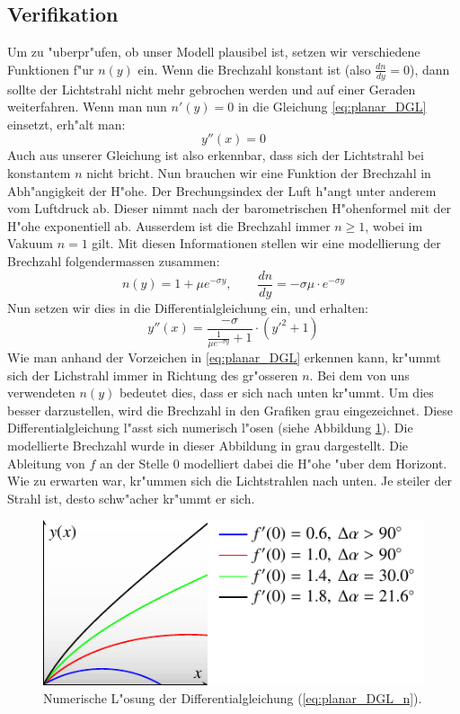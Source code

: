 \begin{refsection}
\subsection{Verifikation}
Um zu "uberpr"ufen, ob unser Modell plausibel ist, setzen wir verschiedene Funktionen f"ur $n(y)$ ein. 
Wenn die Brechzahl konstant ist (also $\frac{dn}{dy} = 0$), dann sollte der Lichtstrahl nicht mehr gebrochen werden und auf einer Geraden weiterfahren. 
Wenn man nun $n'(y)=0$ in die Gleichung \ref{eq:planar_DGL} einsetzt, erh"alt man: 
$$y''(x) = 0$$
Auch aus unserer Gleichung ist also erkennbar, dass sich der Lichtstrahl bei konstantem $n$ nicht bricht.
Nun brauchen wir eine Funktion der Brechzahl in Abh"angigkeit der H"ohe. 
Der Brechungsindex der Luft h"angt unter anderem vom Luftdruck ab. 
Dieser nimmt nach der barometrischen H"ohenformel mit der H"ohe exponentiell ab.
Ausserdem ist die Brechzahl immer $n \geq 1$, wobei im Vakuum $n=1$ gilt. 
Mit diesen Informationen stellen wir eine modellierung der Brechzahl folgendermassen zusammen:
$$n(y) = 1 + \mu e^{- \sigma y}, \qquad \frac{dn}{dy} = -\sigma \mu \cdot e^{-\sigma y}$$
Nun setzen wir dies in die Differentialgleichung ein, und erhalten:
\begin{equation} \label{eq:planar_DGL_n}
y''(x) = \frac{-\sigma}{\displaystyle\frac{1}{\mu e^{-\sigma y}} + 1} \cdot \left( y'^2 + 1 \right)
\end{equation}
Wie man anhand der Vorzeichen in \ref{eq:planar_DGL} erkennen kann, kr"ummt sich der Lichstrahl immer in Richtung des gr"osseren $n$.
Bei dem von uns verwendeten $n(y)$ bedeutet dies, dass er sich nach unten kr"ummt. 
Um dies besser darzustellen, wird die Brechzahl in den Grafiken grau eingezeichnet.
Diese Differentialgleichung l"asst sich numerisch l"osen (siehe Abbildung \ref{fig:planares_modell1}).
Die modellierte Brechzahl wurde in dieser Abbildung in grau dargestellt. 
Die Ableitung von $f$ an der Stelle $0$ modelliert dabei die H"ohe "uber dem Horizont.
Wie zu erwarten war, kr"ummen sich die Lichtstrahlen nach unten.
Je steiler der Strahl ist, desto schw"acher kr"ummt er sich. 
\begin{figure}
  \centering
  \includegraphics{licht/standalone/fig_planar_simulation.pdf}
  \caption{Numerische L"osung der Differentialgleichung (\ref{eq:planar_DGL_n}). \label{fig:planares_modell1}}
\end{figure}


\end{refsection}
